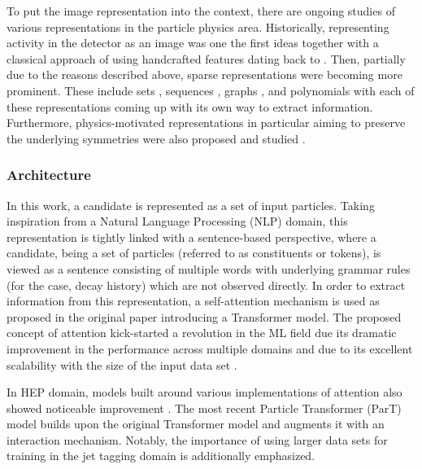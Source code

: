 To put the image representation into the context, there are ongoing studies of various representations in the particle physics area. Historically, representing activity in the detector as an image was one the first ideas together with a classical approach of using handcrafted features dating back to \cite{DENBY1988429}. Then, partially due to the reasons described above, sparse representations were becoming more prominent. These include sets \cite{Komiske:2018cqr}, sequences \cite{deLima:2021fwm}, graphs \cite{Thais:2022iok}, and polynomials \cite{Munoz:2022gjq} with each of these representations coming up with its own way to extract information. Furthermore, physics-motivated representations in particular aiming to preserve the underlying symmetries were also proposed and studied \cite{Dreyer:2020brq, Baldi:2022okj, Bogatskiy:2022hub, Shimmin:2021pkm}.

\subsubsection{Architecture}
In this work, a \tauh candidate is represented as a set of input particles. Taking inspiration from a Natural Language Processing (NLP) domain, this representation is tightly linked with a sentence-based perspective, where a \tauh candidate, being a set of particles (referred to as constituents or tokens), is viewed as a sentence consisting of multiple words with underlying grammar rules (for the \tauh case, decay history) which are not observed directly. In order to extract information from this representation, a self-attention mechanism is used as proposed in the original paper \cite{vaswani2017attention} introducing a Transformer model. The proposed concept of attention kick-started a revolution in the ML field due its dramatic improvement in the performance across multiple domains and due to its excellent scalability with the size of the input data set \cite{phuong2022formal}. 

In HEP domain, models built around various implementations of attention also showed noticeable improvement \cite{Mikuni:2020wpr, Mikuni:2021pou}. The most recent Particle Transformer (ParT) \cite{Qu:2022mxj} model builds upon the original Transformer model and augments it with an interaction mechanism. Notably, the importance of using larger data sets for training in the jet tagging domain is additionally emphasized.

